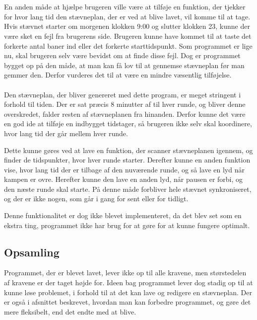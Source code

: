 \\\\
En anden måde at hjælpe brugeren ville være at tilføje en funktion, der tjekker for hvor lang tid den stævneplan, der er ved at blive lavet, vil komme til at tage. Hvis stævnet starter om morgenen klokken 9:00 og slutter klokken 23, kunne der være sket en fejl fra brugerens side. Brugeren kunne have kommet til at taste det forkerte antal baner ind eller det forkerte starttidspunkt. Som programmet er lige nu, skal brugeren selv være bevidst om at finde disse fejl. Dog er programmet bygget op på den måde, at man kan få lov til at gennemse stævneplan før man gemmer den. Derfor vurderes det til at være en mindre væsentlig tilføjelse.  
\\\\
Den stævneplan, der bliver genereret med dette program, er meget stringent i forhold til tiden. Der er sat præcis 8 minutter af til hver runde, og bliver denne overskredet, falder resten af stævneplanen fra hinanden. Derfor kunne det være en god ide at tilføje en indbygget tidstager, så brugeren ikke selv skal koordinere, hvor lang tid der går mellem hver runde. 
\par
Dette kunne gøres ved at lave en funktion, der scanner stævneplanen igennem, og finder de tidspunkter, hvor hver runde starter. Derefter kunne en anden funktion vise, hvor lang tid der er tilbage af den nuværende runde, og så lave en lyd når kampen er ovre. Herefter kunne den lave en anden lyd, når pausen er forbi, og den næste runde skal starte. På denne måde forbliver hele stævnet synkroniseret, og der er ikke nogen, som går i gang for sent eller for tidligt.
\par
Denne funktionalitet er dog ikke blevet implementeret, da det blev set som en ekstra ting, programmet ikke har brug for at gøre for at kunne fungere optimalt.

\subsection*{Opsamling} 
Programmet, der er blevet lavet, lever ikke op til alle kravene, men størstedelen af kravene er der taget højde for. Ideen bag programmet lever dog stadig op til at kunne løse problemet, i forhold til at det kan lave og redigere en stævneplan. Der er også i afsnittet beskrevet, hvordan man kan forbedre programmet, og gøre det mere fleksibelt, end det endte med at blive.


